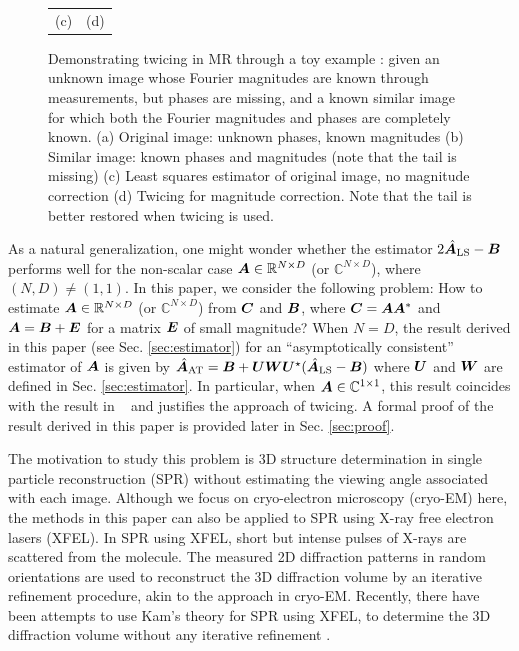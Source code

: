 \begin{figure}[]
\begin{tabular}{cc}
(c) & (d)\\
\end{tabular}
\caption{ Demonstrating twicing in MR through a toy example \cite{CowtanCat}: 
given an unknown
image whose Fourier magnitudes are known through measurements, but phases are
missing, and a known similar image for which
both the Fourier magnitudes and phases are completely known.  (a) Original
image: unknown phases, known magnitudes (b) Similar image: known phases and
magnitudes (note that the tail is missing)
(c) Least squares estimator of original image, no magnitude correction (d)
Twicing for magnitude
correction. Note that the tail is better restored when twicing is used.}
\label{fig:tail_cat}
\end{figure}

As a natural generalization, one might wonder whether the estimator
$2\hat{\boldsymbol{A}}_{\text{LS}}-\boldsymbol{B}$ performs well for the non-scalar case $\boldsymbol{A}\in\mathbb{R}^{N\times D}$ (or
$\mathbb{C}^{N\times D}$), where $(N,D)\neq (1,1)$.  In this paper, we consider 
the following problem: How to estimate
$\boldsymbol{A} \in\mathbb{R}^{N\times D}$ (or $\mathbb{C}^{N\times D}$) from $\boldsymbol{C}$ and
$\boldsymbol{B}$, where $\boldsymbol{C}=\boldsymbol{A} \boldsymbol{A}^*$ and $\boldsymbol{A}=\boldsymbol{B}+\boldsymbol{E}$ for a matrix $\boldsymbol{E}$ of small
magnitude? When  $N=D$, the result derived in this paper (see Sec. 
\ref{sec:estimator}) for an ``asymptotically consistent'' estimator of $\boldsymbol{A}$ is
given by $\hat{\boldsymbol{A}}_{\text{AT}} = \boldsymbol{B} + \boldsymbol{U} \boldsymbol{W} {\boldsymbol{U}}^{\star} 
(\hat{\boldsymbol{A}}_{\text{LS}}-\boldsymbol{B})$
where $\boldsymbol{U}$ and $\boldsymbol{W}$ are defined in Sec. \ref{sec:estimator}. In particular, 
when $\boldsymbol{A} \in\mathbb{C}^{1\times 1}$, this result coincides
with the result in ~\cite{Main1979} and justifies the approach of twicing. A 
formal proof
of the result derived in this paper is provided later in Sec. \ref{sec:proof}.

The motivation to study this problem is 3D structure determination 
in single particle reconstruction (SPR) without estimating the viewing angle associated with each image.
Although we focus on cryo-electron microscopy (cryo-EM) here, the methods in this paper can also be applied 
to SPR using X-ray free electron lasers (XFEL). In SPR using XFEL, short but 
intense pulses of X-rays are scattered from the molecule. The measured 2D 
diffraction patterns in random orientations are used to reconstruct the 3D 
diffraction volume by an iterative refinement procedure, akin to the approach in cryo-EM. 
Recently, there have been attempts to use Kam's theory for SPR using XFEL, to 
determine the 3D diffraction volume without any iterative refinement \cite{Saldin2009, Hosseinizadeh2015, Starodub12ncom}.

